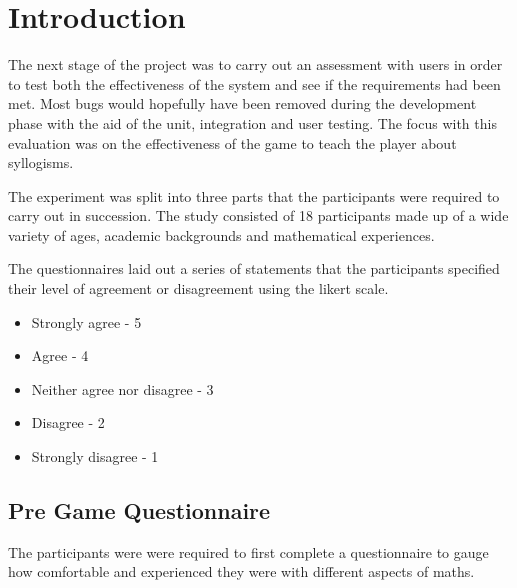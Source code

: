 \documentclass[12pt,a4paper]{report}
\begin{document}
\section{Introduction}
The next stage of the project was to carry out an assessment with users in order to test both the effectiveness of the system and see if the requirements had been met. Most bugs would hopefully have been removed during the development phase with the aid of the unit, integration and user testing. The focus with this evaluation was on the effectiveness of the game to teach the player about syllogisms.

The experiment was split into three parts that the participants were required to carry out in succession. The study consisted of 18 participants made up of a wide variety of ages, academic backgrounds and mathematical experiences. 


The questionnaires laid out a series of statements that the participants specified their level of agreement or disagreement using the likert scale. 

\begin{itemize}
	\item Strongly agree - 5
	\item Agree - 4
	\item Neither agree nor disagree - 3
	\item Disagree - 2
	\item Strongly disagree - 1
\end{itemize}	

\subsection{Pre Game Questionnaire}

The participants were were required to first complete a questionnaire to gauge how comfortable and experienced they were with different aspects of maths.
\end{document}
